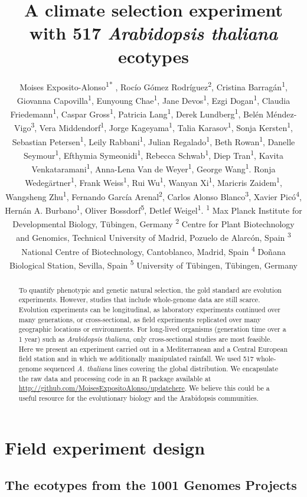 \documentclass[12pt,]{article}
\title{A climate selection experiment with 517 \emph{Arabidopsis thaliana}
ecotypes}
\author{\newline \normalfont Moises
Exposito-Alonso\textsuperscript{1}\textsuperscript{*} , Rocío Gómez
Rodríguez\textsuperscript{2}, Cristina Barragán\textsuperscript{1},
Giovanna Capovilla\textsuperscript{1}, Eunyoung Chae\textsuperscript{1},
Jane Devos\textsuperscript{1}, Ezgi Dogan\textsuperscript{1}, Claudia
Friedemann\textsuperscript{1}, Caspar Gross\textsuperscript{1}, Patricia
Lang\textsuperscript{1}, Derek Lundberg\textsuperscript{1}, Belén
Méndez-Vigo\textsuperscript{3}, Vera Middendorf\textsuperscript{1},
Jorge Kageyama\textsuperscript{1}, Talia Karasov\textsuperscript{1},
Sonja Kersten\textsuperscript{1}, Sebastian Petersen\textsuperscript{1},
Leily Rabbani\textsuperscript{1}, Julian Regalado\textsuperscript{1},
Beth Rowan\textsuperscript{1}, Danelle Seymour\textsuperscript{1},
Efthymia Symeonidi\textsuperscript{1}, Rebecca
Schwab\textsuperscript{1}, Diep Tran\textsuperscript{1}, Kavita
Venkataramani\textsuperscript{1}, Anna-Lena Van de
Weyer\textsuperscript{1}, George Wang\textsuperscript{1}. Ronja
Wedegärtner\textsuperscript{1}, Frank Weiss\textsuperscript{1}, Rui
Wu\textsuperscript{1}, Wanyan Xi\textsuperscript{1}, Maricris
Zaidem\textsuperscript{1}, Wangsheng Zhu\textsuperscript{1}, Fernando
García Arenal\textsuperscript{2}, Carlos Alonso
Blanco\textsuperscript{3}, Xavier Picó\textsuperscript{4}, Hernán A.
Burbano\textsuperscript{1}, Oliver Bossdorf\textsuperscript{5}, Detlef
Weigel\textsuperscript{1}. \newline \small \newline \textsuperscript{1}
Max Planck Institute for Developmental Biology, Tübingen, Germany
\newline \textsuperscript{2} Centre for Plant Biotechnology and
Genomics, Technical University of Madrid, Pozuelo de Alarcón, Spain
\newline \textsuperscript{3} National Centre of Biotechnology,
Cantoblanco, Madrid, Spain \newline \textsuperscript{4} Doñana
Biological Station, Sevilla, Spain \newline \textsuperscript{5}
University of Tübingen, Tübingen, Germany \newline 
\newline \newline \newline \newline \newline \newline}
\date{}
\begin{document}
\maketitle
\begin{abstract}
To quantify phenotypic and genetic natural selection, the gold standard
are evolution experiments. However, studies that include whole-genome
data are still scarce. Evolution experiments can be longitudinal, as
laboratory experiments continued over many generations, or
cross-sectional, as field experiments replicated over many geographic
locations or environments. For long-lived organisms (generation time
over a 1 year) such as \textit{Arabidopsis thaliana}, only
cross-sectional studies are most feasible. Here we present an experiment
carried out in a Mediterranean and a Central European field station and
in which we additionally manipulated rainfall. We used 517 whole-genome
sequenced \textit{A. thaliana} lines covering the global distribution.
We encapsulate the raw data and processing code in an R package
available at \url{http://github.com/MoisesExpositoAlonso/updatehere}. We
believe this could be a useful resource for the evolutionary biology and
the Arabidopsis communities.
\end{abstract}

\section{Field experiment design}\label{field-experiment-design}

\subsection{The ecotypes from the 1001 Genomes
Projects}\label{the-ecotypes-from-the-1001-genomes-projects}
\end{document}
